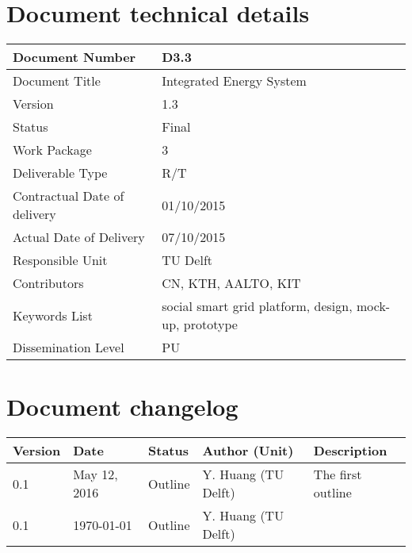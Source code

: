 
\section*{Document technical details}

\begin{tabularx}{\textwidth}{|X|X|}
\hline
Document Number	& D3.3 \\ \hline
Document Title	&  Integrated Energy System\\ \hline
Version	&  1.3\\ \hline
Status	 &  Final \\ \hline
Work Package		&  3\\ \hline
Deliverable Type 	&  R/T \\ \hline
Contractual Date of delivery 	&  01/10/2015 \\ \hline
Actual Date of Delivery		&  07/10/2015 \\ \hline
Responsible Unit	&  TU Delft \\ \hline
Contributors & CN, KTH, AALTO, KIT \\ \hline
Keywords List &  social smart grid platform, design, mock-up, prototype\\ \hline
Dissemination Level	&  PU \\ \hline
\end{tabularx}

\clearpage

\section*{Document changelog}

{
\begin{tabularx}{\textwidth}{|l|l|l|>{\raggedright\arraybackslash}p{4cm}|X|}
\hline
\textbf{Version}	& \textbf{Date} &	\textbf{Status} &	\textbf{Author (Unit)} &	\textbf{Description}  \\ \hline
0.1 & May 12, 2016 & Outline & Y. Huang (TU Delft) & The first outline\\ \hline
0.1 & \today & Outline & Y. Huang (TU Delft) &  \\ \hline

\end{tabularx}
}


